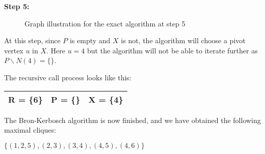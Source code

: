 \begin{minipage}{\linewidth}
    \textbf{Step 5:}

    \begin{minipage}{0.4\linewidth}
        \begin{figure}[H]
            \centering
            \caption{Graph illustration for the exact algorithm at step 5}
            \label{fig:exact-mewc-step5}
        \end{figure}
    \end{minipage}
    \hspace{0.04\linewidth}
    \begin{minipage}{0.55\linewidth}
        At this step, since $P$ is empty and $X$ is not, the algorithm will
        choose a pivot vertex $u$ in $X$. Here $u = 4$ but the algorithm will
        not be able to iterate further as $P\backslash N(4) = \{\}$. \bigskip

        The recursive call process looks like this:
        \begin{center}
            \begin{tabular}{|lll|}
                \hline
                R = \{6\} & P = \{\} & X = \{4\} \\
                \hline
            \end{tabular}
        \end{center}
    \end{minipage}
\end{minipage} \bigskip

The Bron-Kerbosch algorithm is now finished, and we have obtained the following
maximal cliques:
\begin{center}
    $\{(1,2,5),(2,3),(3,4),(4,5),(4,6)\}$
\end{center}

